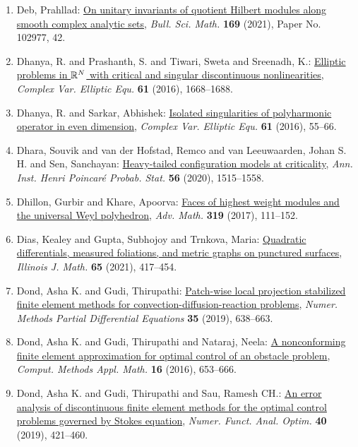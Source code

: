\begin{enumerate}
\item Deb, Prahllad: \href{https://doi.org/10.1016/j.bulsci.2021.102977}{On unitary invariants of quotient {H}ilbert modules along
smooth complex analytic sets}, \emph{Bull. Sci. Math.} {\bf 169} (2021), Paper No. 102977, 42.
\item Dhanya, R. and Prashanth, S. and Tiwari, Sweta and Sreenadh,
K.: \href{https://doi.org/10.1080/17476933.2016.1198787}{Elliptic problems in {${\Bbb R}^N$} with critical and singular
discontinuous nonlinearities}, \emph{Complex Var. Elliptic Equ.} {\bf 61} (2016), 1668--1688.
\item Dhanya, R. and Sarkar, Abhishek: \href{https://doi.org/10.1080/17476933.2015.1055735}{Isolated singularities of polyharmonic operator in even
dimension}, \emph{Complex Var. Elliptic Equ.} {\bf 61} (2016), 55--66.
\item Dhara, Souvik and van der Hofstad, Remco and van Leeuwaarden,
Johan S. H. and Sen, Sanchayan: \href{https://doi.org/10.1214/19-AIHP980}{Heavy-tailed configuration models at criticality}, \emph{Ann. Inst. Henri Poincar\'{e} Probab. Stat.} {\bf 56} (2020), 1515--1558.
\item Dhillon, Gurbir and Khare, Apoorva: \href{https://doi.org/10.1016/j.aim.2017.08.005}{Faces of highest weight modules and the universal {W}eyl
polyhedron}, \emph{Adv. Math.} {\bf 319} (2017), 111--152.
\item Dias, Kealey and Gupta, Subhojoy and Trnkova, Maria: \href{https://doi.org/10.1215/00192082-8827639}{Quadratic differentials, measured foliations, and metric
graphs on punctured surfaces}, \emph{Illinois J. Math.} {\bf 65} (2021), 417--454.
\item Dond, Asha K. and Gudi, Thirupathi: \href{https://doi.org/10.1002/num.22317}{Patch-wise local projection stabilized finite element methods
for convection-diffusion-reaction problems}, \emph{Numer. Methods Partial Differential Equations} {\bf 35} (2019), 638--663.
\item Dond, Asha K. and Gudi, Thirupathi and Nataraj, Neela: \href{https://doi.org/10.1515/cmam-2016-0024}{A nonconforming finite element approximation for optimal
control of an obstacle problem}, \emph{Comput. Methods Appl. Math.} {\bf 16} (2016), 653--666.
\item Dond, Asha K. and Gudi, Thirupathi and Sau, Ramesh CH.: \href{https://doi.org/10.1080/01630563.2018.1538158}{An error analysis of discontinuous finite element methods for
the optimal control problems governed by {S}tokes equation}, \emph{Numer. Funct. Anal. Optim.} {\bf 40} (2019), 421--460.

\end{enumerate}

